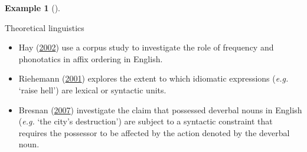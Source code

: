 \documentclass[
  letterpaper,
  DIV=11,
  numbers=noendperiod]{scrreport}
\providecommand{\tightlist}{%
  \setlength{\itemsep}{0pt}\setlength{\parskip}{0pt}}\usepackage{longtable,booktabs,array}
\theoremstyle{definition}
\newtheorem{example}{Example}[chapter]
\theoremstyle{remark}
\begin{document}
\begin{example}[]\protect\hypertarget{exm-linguistic-theory}{}\label{exm-linguistic-theory}

Theoretical linguistics

\begin{itemize}
\tightlist
\item
  Hay (\protect\hyperlink{ref-Hay2002}{2002}) use a corpus study to
  investigate the role of frequency and phonotatics in affix ordering in
  English.
\item
  Riehemann (\protect\hyperlink{ref-Riehemann2001}{2001}) explores the
  extent to which idiomatic expressions (\emph{e.g.} `raise hell') are
  lexical or syntactic units.
\item
  Bresnan (\protect\hyperlink{ref-Bresnan2007a}{2007}) investigate the
  claim that possessed deverbal nouns in English (\emph{e.g.} `the
  city's destruction') are subject to a syntactic constraint that
  requires the possessor to be affected by the action denoted by the
  deverbal noun.
\end{itemize}

\end{example}
\end{document}
